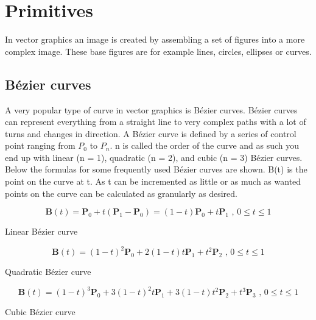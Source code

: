 \section{Primitives}

In vector graphics an image is created by assembling a set of figures into a more complex image.
These base figures are for example lines, circles, ellipses or curves.

\subsection{Bézier curves}

A very popular type of curve in vector graphics is Bézier curves.
Bézier curves can represent everything from a straight line to very complex paths with a lot of turns and changes in direction.
A Bézier curve is defined by a series of control point ranging from \(P_0\) to \(P_n\). 
n is called the order of the curve and as such you end up with linear (n = 1), quadratic (n = 2), and cubic (n = 3) Bézier curves.
Below the formulas for some frequently used Bézier curves are shown. B(t) is the point on the curve at t.
As t can be incremented as little or as much as wanted points on the curve can be calculated as granularly as desired.

\begin{cequation}[H]
	\begin{equation*}
		\mathbf{B}(t)=\mathbf{P}_0 + t(\mathbf{P}_1-\mathbf{P}_0)=(1-t)\mathbf{P}_0 + t\mathbf{P}_1 \mbox{ , } 0 \le t \le 1
	\end{equation*}
	\caption{Linear Bézier curve}
\end{cequation}

\begin{cequation}[H]
	\begin{equation*}
		\mathbf{B}(t) = (1 - t)^{2}\mathbf{P}_0 + 2(1 - t)t\mathbf{P}_1 + t^{2}\mathbf{P}_2 \mbox{ , } 0 \le t \le 1
	\end{equation*}
	\caption{Quadratic Bézier curve}
\end{cequation}

\begin{cequation}[H]
	\begin{equation*}
		\mathbf{B}(t)=(1-t)^3\mathbf{P}_0+3(1-t)^2t\mathbf{P}_1+3(1-t)t^2\mathbf{P}_2+t^3\mathbf{P}_3 \mbox{ , } 0 \le t \le 1
	\end{equation*}
	\caption{Cubic Bézier curve}
\end{cequation}
